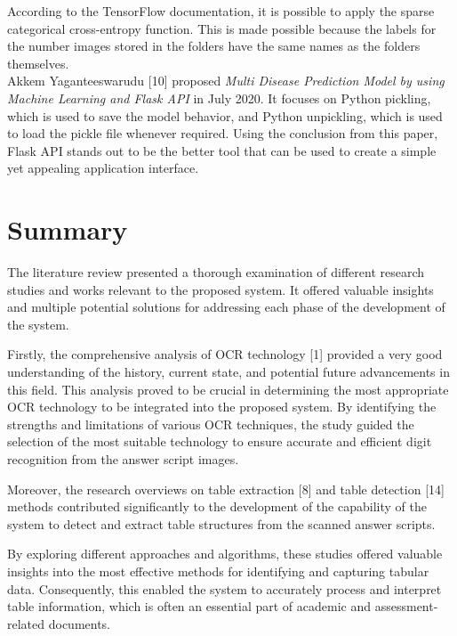 \noindent
According to the TensorFlow documentation, it is possible to apply the sparse categorical cross-entropy function. This is made possible because the labels for the number images stored in the folders have the same names as the folders themselves. \\

\noindent
Akkem Yaganteeswarudu [10] proposed {\it Multi Disease Prediction Model by using Machine Learning and Flask API} in July 2020. 
\noindent
It focuses on Python pickling, which is used to save the model behavior, and Python unpickling, which is used to load the pickle file whenever required. Using the conclusion from this paper, Flask API stands out to be the better tool that can be used to create a simple yet appealing application interface.


\section{Summary}

\noindent 
The literature review presented a thorough examination of different research studies and works relevant to the proposed system. It offered valuable insights and multiple potential solutions for addressing each phase of the development of the system.

\vspace{3mm}

\noindent
Firstly, the comprehensive analysis of OCR technology [1] provided a very good understanding of the history, current state, and potential future advancements in this field. This analysis proved to be crucial in determining the most appropriate OCR technology to be integrated into the proposed system. By identifying the strengths and limitations of various OCR techniques, the study guided the selection of the most suitable technology to ensure accurate and efficient digit recognition from the answer script images.

\vspace{3mm}

\noindent
Moreover, the research overviews on table extraction [8] and table detection [14] methods contributed significantly to the development of the capability of the system to detect and extract table structures from the scanned answer scripts.

\clearpage

\noindent
By exploring different approaches and algorithms, these studies offered valuable insights into the most effective methods for identifying and capturing tabular data. Consequently, this enabled the system to accurately process and interpret table information, which is often an essential part of academic and assessment-related documents.

